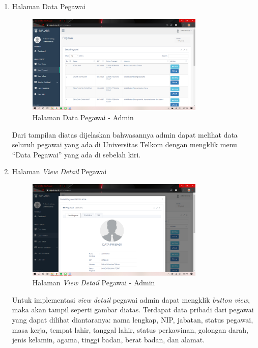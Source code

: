 \begin{enumerate}
	\item Halaman Data Pegawai
	\begin{figure}
		\centering
		\includegraphics[width=0.8\textwidth]
		{pics/admin/implementasi/datapegawai.png}
		\caption{Halaman Data Pegawai - Admin}
		\label{fig:CC10}
	\end{figure}
	Dari tampilan diatas dijelaskan bahwasannya admin dapat melihat data seluruh pegawai yang ada di Universitas Telkom dengan mengklik menu “Data Pegawai” yang ada di sebelah kiri.
	
	\item Halaman \textit{View Detail} Pegawai
	\begin{figure}
		\centering
		\includegraphics[width=0.8\textwidth]
		{pics/admin/implementasi/viewdetailpegawai.png}
		\caption{Halaman \textit{View Detail} Pegawai - Admin}
		\label{fig:CC10}
	\end{figure}
	Untuk implementasi \textit{view detail} pegawai admin dapat mengklik \textit{button view}, maka akan tampil seperti gambar diatas. Terdapat data pribadi dari pegawai yang dapat dilihat diantaranya: nama lengkap, NIP, jabatan, status pegawai, masa kerja, tempat lahir, tanggal lahir, status perkawinan, golongan darah, jenis kelamin, agama, tinggi badan, berat badan, dan alamat.
	

\end{enumerate}

